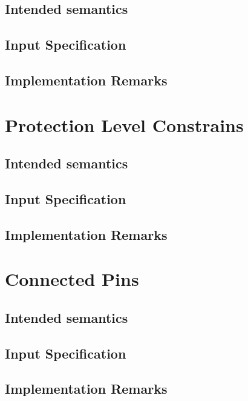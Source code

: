 \subsection{Intended semantics}

\subsection{Input Specification}

\subsection{Implementation Remarks}

\section{Protection Level Constrains}
\label{sec:prot-level-constr}

\subsection{Intended semantics}

\subsection{Input Specification}

\subsection{Implementation Remarks}

\section{Connected Pins}
\label{sec:connected-pins}

\subsection{Intended semantics}

\subsection{Input Specification}

\subsection{Implementation Remarks}


